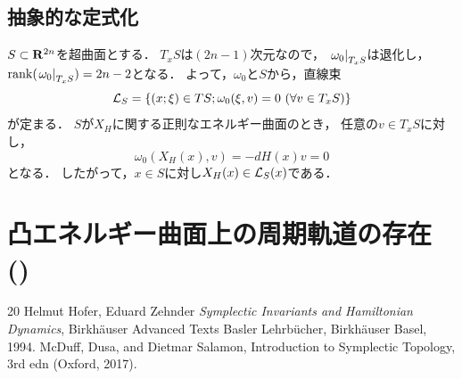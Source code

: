 \subsection*{抽象的な定式化}
\(S\subset \rr^{2n}\)を超曲面とする．
\(T_xS\)は\((2n-1)\)次元なので，
\(\mres[\omega_{0}]{T_{x}S}\)は退化し，
\(\rank(\mres[\omega_{0}]{T_{x}S})=2n-2\)となる．
よって，\(\omega_0\)と\(S\)から，直線束
\[
    \cL_S
    =
    \left\{
        (x;\xi)\in TS;
        \omega_0(\xi,v)=0\ (\forall v\in T_xS)
    \right\}
\]が定まる．
\(S\)が\(X_H\)に関する正則なエネルギー曲面のとき，
任意の\(v\in T_xS\)に対し，
\[
    \omega_0(X_{H}(x),v)=-dH(x)v=0
\]
となる．
したがって，\(x\in S\)に対し\(X_H(x)\in\cL_S(x)\)である．


\section{凸エネルギー曲面上の周期軌道の存在 (\cite[\S1.5]{HZ94})}


\begin{thebibliography}{20} 
    Helmut Hofer, Eduard Zehnder
    \textit{Symplectic Invariants and Hamiltonian Dynamics}, 
    Birkh\"auser Advanced Texts Basler Lehrb\"ucher, Birkh\"auser Basel, 1994.
     McDuff, Dusa, 
    and Dietmar Salamon, 
    Introduction to Symplectic Topology, 
    3rd edn (Oxford, 2017).
\end{thebibliography}





